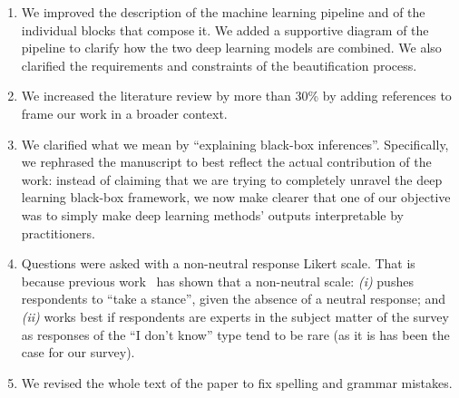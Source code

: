 \documentclass{paper}
\begin{document}
\begin{enumerate}


\item We improved the description of the machine learning pipeline and of the individual blocks that compose it. We added a supportive diagram of the pipeline to clarify how the two deep learning models are combined. 
We also clarified the requirements and constraints of the beautification process.

\item We increased the literature review by more than 30\% by adding references to frame our work in a broader context. 

\item We clarified what we mean by ``explaining black-box inferences''. Specifically, we rephrased the manuscript to best reflect the actual contribution of the work: instead of claiming that we are trying to completely unravel the deep learning black-box framework, we now make clearer that one of our objective was to simply make deep learning methods' outputs interpretable by practitioners.  

\item Questions were asked with a non-neutral response Likert scale. That is because previous work~\cite{Agree2012,moors2008exploring} has shown that a non-neutral scale: \emph{(i)} pushes respondents to ``take a stance'', given the absence of a neutral response; and \emph{(ii)} works best if respondents are experts in the subject matter of the survey as responses of the ``I don't know'' type tend to be rare (as it is has been the case for our survey). 


\item We revised the whole text of the paper to fix spelling and grammar mistakes.

\end{enumerate}
\end{document}
